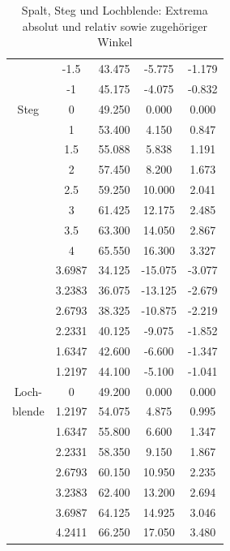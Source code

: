 \documentclass[12pt,a4paper,titlepage,headinclude,bibtotoc]{scrartcl}
\begin{document}
\begin{table}[!htb]
\begin{tabular}{|c||c|c|c|c|}
		&	-1.5	&	43.475	&	-5.775	&	-1.179	\\
		&	-1	&	45.175	&	-4.075	&	-0.832	\\
		Steg &	0	&	49.250	&	0.000	&	0.000	\\
		&	1	&	53.400	&	4.150	&	0.847	\\
		&	1.5	&	55.088	&	5.838	&	1.191	\\
		&	2	&	57.450	&	8.200	&	1.673	\\
		&	2.5	&	59.250	&	10.000	&	2.041	\\
		&	3	&	61.425	&	12.175	&	2.485	\\
		&	3.5	&	63.300	&	14.050	&	2.867	\\
		&	4	&	65.550	&	16.300	&	3.327	\\
		\hline
		&	3.6987	&	34.125	&	-15.075	&	-3.077	\\
		&	3.2383	&	36.075	&	-13.125	&	-2.679	\\
		&	2.6793	&	38.325	&	-10.875	&	-2.219	\\
		&	2.2331	&	40.125	&	-9.075	&	-1.852	\\
		&	1.6347	&	42.600	&	-6.600	&	-1.347	\\
		&	1.2197	&	44.100	&	-5.100	&	-1.041	\\
		Loch- &	0	&	49.200	&	0.000	&	0.000	\\
		blende &	1.2197	&	54.075	&	4.875	&	0.995	\\
		&	1.6347	&	55.800	&	6.600	&	1.347	\\
		&	2.2331	&	58.350	&	9.150	&	1.867	\\
		&	2.6793	&	60.150	&	10.950	&	2.235	\\
		&	3.2383	&	62.400	&	13.200	&	2.694	\\
		&	3.6987	&	64.125	&	14.925	&	3.046	\\
		&	4.2411	&	66.250	&	17.050	&	3.480	\\
		\hline
	\end{tabular}
	\caption{Spalt, Steg und Lochblende: Extrema absolut und relativ sowie zugehöriger Winkel}
	\label{tab:extrema1}
\end{table}
\end{document}
